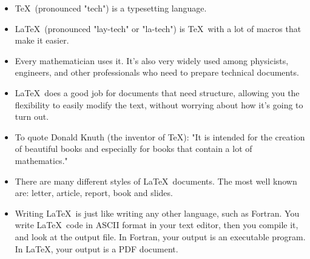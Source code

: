 \documentclass[12pt]{book}
\begin{document}
 \label{ch1}

\begin{itemize}
\item \TeX~(pronounced "tech") is a typesetting language.
\item \LaTeX~(pronounced "lay-tech" or "la-tech") is \TeX~with a lot of macros that make it easier.
\item Every mathematician uses it. It's also very widely used among physicists, engineers, and other
      professionals who need to prepare technical documents.
\item \LaTeX~does a good job for documents that need structure, allowing you the
      flexibility to easily modify the text, without worrying about how it's going to
      turn out.
\item To quote Donald Knuth (the inventor of \TeX): "It is intended for the
      creation of beautiful books and especially for books that contain a lot
      of mathematics."
\item There are many different styles of \LaTeX~documents. The most well known are: letter,
      article, report, book and slides.
\item Writing \LaTeX~is just like writing any other language, such as Fortran. You
      write \LaTeX~code in ASCII format in your text editor, then you compile it,
      and look at the output file. In Fortran, your output is an executable program.
      In \LaTeX, your output is a PDF document.
\end{itemize}

 \label{ch2}
\end{document}
